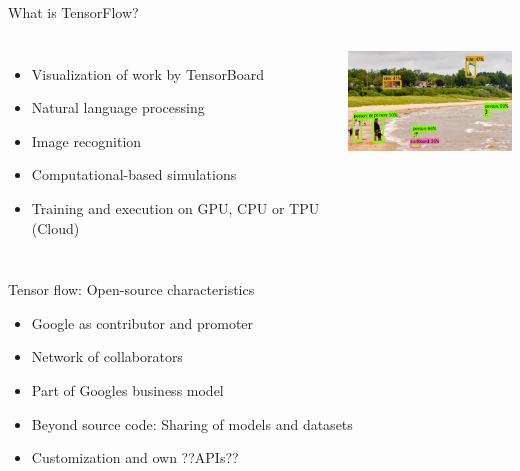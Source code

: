 \begin{frame}{What is TensorFlow?}

        \begin{columns}[T]
            \vspace{1cm}
            \begin{itemize}
                \item Visualization of work by TensorBoard
                \item Natural language processing
                \item Image recognition
                \item Computational-based simulations
                \item Training and execution on GPU, CPU or TPU (Cloud)
            \end{itemize}
        
             \vspace{-0cm}
             \hspace*{-5cm}
             \includegraphics[width=5cm]{assets/TensorFlow_ObjectDetection(2).png}
                 \\
                 \vspace{-.1cm}
                 \hspace*{-5cm}\caption{Source: tensorflow.org}
        \end{columns}
\end{frame}

\begin{frame}{Tensor flow: Open-source characteristics}
    \begin{itemize}
        \item Google as contributor and promoter
        \item Network of collaborators 
        \item Part of Googles business model
        \item Beyond source code: Sharing of models and datasets
        \item Customization and own ??APIs??
    \end{itemize}
\end{frame}


